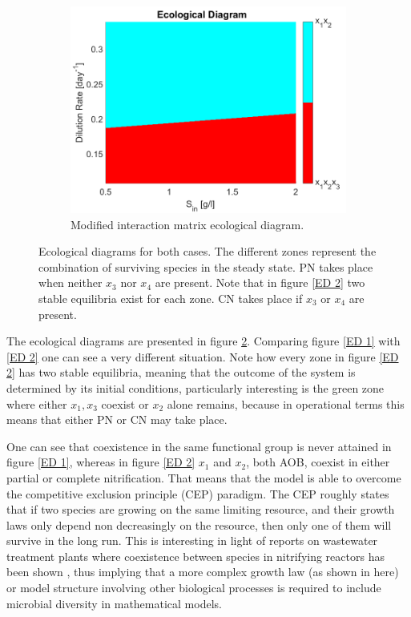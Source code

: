 \documentclass[3p,times]{article}
\begin{document}
\begin{figure}[ht]
\begin{subfigure}[b]{0.32\textwidth}
	\includegraphics[width=\textwidth]{Stability/ED_parameters_modified_2}
	\caption{Modified interaction matrix ecological diagram.}
	\label{ED 3}
\end{subfigure}

	\caption{Ecological diagrams for both cases. The different zones represent the combination of surviving species in the steady state. PN takes place when neither $x_3$ nor $x_4$ are present. Note that in figure \ref{ED 2} two stable equilibria exist for each zone. CN takes place if $x_3$ or $x_4$ are present. }
	\label{ecological_diagrams}
\end{figure}

The ecological diagrams are presented in figure \ref{ecological_diagrams}. Comparing figure \ref{ED 1} with \ref{ED 2} one can see a very different situation. Note how every zone in figure \ref{ED 2} has two stable equilibria, meaning that the outcome of the system is determined by its initial conditions, particularly interesting is the green zone where either $x_1,x_3$ coexist or $x_2$ alone remains, because in operational terms this means that either PN or CN may take place.

One can see that coexistence in the same functional group is never attained in figure \ref{ED 1}, whereas in figure \ref{ED 2} $x_1$ and $x_2$, both AOB, coexist in either partial or complete nitrification. That means that the model is able to overcome the competitive exclusion principle \cite{lobry2017chemostat} (CEP) paradigm. The CEP roughly states that if two species are growing on the same limiting resource, and their growth laws only depend non decreasingly on the resource, then only one of them will survive in the long run. This is interesting in light of reports on wastewater treatment plants where coexistence between species in nitrifying reactors has been shown \cite{Wagner2002}, thus implying that a more complex growth law (as shown in here) or model structure involving other biological processes is required to include microbial diversity in mathematical models. 
\end{document}
